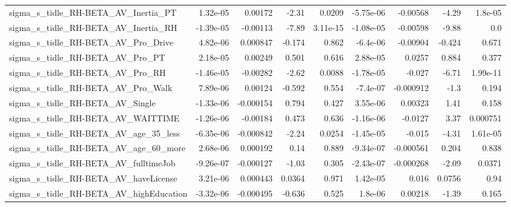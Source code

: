 \begin{tabular}{lrrrrrrrr}
sigma\_s\_tidle\_RH-BETA\_AV\_Inertia\_PT                &    1.32e-05 &      0.00172 &    -2.31 &   0.0209 &  -5.75e-06 &    -0.00568 &        -4.29 &       1.8e-05 \\
sigma\_s\_tidle\_RH-BETA\_AV\_Inertia\_RH                &   -1.39e-05 &     -0.00113 &    -7.89 & 3.11e-15 &  -1.08e-05 &    -0.00598 &        -9.88 &           0.0 \\
sigma\_s\_tidle\_RH-BETA\_AV\_Pro\_Drive                 &    4.82e-06 &     0.000847 &   -0.174 &    0.862 &   -6.4e-06 &    -0.00904 &       -0.424 &         0.671 \\
sigma\_s\_tidle\_RH-BETA\_AV\_Pro\_PT                    &    2.18e-05 &      0.00249 &    0.501 &    0.616 &   2.88e-05 &      0.0257 &        0.884 &         0.377 \\
sigma\_s\_tidle\_RH-BETA\_AV\_Pro\_RH                    &   -1.46e-05 &     -0.00282 &    -2.62 &   0.0088 &  -1.78e-05 &      -0.027 &        -6.71 &      1.99e-11 \\
sigma\_s\_tidle\_RH-BETA\_AV\_Pro\_Walk                  &    7.89e-06 &      0.00124 &   -0.592 &    0.554 &   -7.4e-07 &   -0.000912 &         -1.3 &         0.194 \\
sigma\_s\_tidle\_RH-BETA\_AV\_Single                    &   -1.33e-06 &    -0.000154 &    0.794 &    0.427 &   3.55e-06 &     0.00323 &         1.41 &         0.158 \\
sigma\_s\_tidle\_RH-BETA\_AV\_WAITTIME                  &   -1.26e-06 &     -0.00184 &    0.473 &    0.636 &  -1.16e-06 &     -0.0127 &         3.37 &      0.000751 \\
sigma\_s\_tidle\_RH-BETA\_AV\_age\_35\_less               &   -6.35e-06 &    -0.000842 &    -2.24 &   0.0254 &  -1.45e-05 &      -0.015 &        -4.31 &      1.61e-05 \\
sigma\_s\_tidle\_RH-BETA\_AV\_age\_60\_more               &    2.68e-06 &     0.000192 &     0.14 &    0.889 &  -9.34e-07 &   -0.000561 &        0.204 &         0.838 \\
sigma\_s\_tidle\_RH-BETA\_AV\_fulltimeJob               &   -9.26e-07 &    -0.000127 &    -1.03 &    0.305 &  -2.43e-07 &   -0.000268 &        -2.09 &        0.0371 \\
sigma\_s\_tidle\_RH-BETA\_AV\_haveLicense               &    3.21e-06 &     0.000443 &   0.0364 &    0.971 &   1.42e-05 &       0.016 &       0.0756 &          0.94 \\
sigma\_s\_tidle\_RH-BETA\_AV\_highEducation             &   -3.32e-06 &    -0.000495 &   -0.636 &    0.525 &    1.8e-06 &     0.00218 &        -1.39 &         0.165 \\

\end{tabular}
